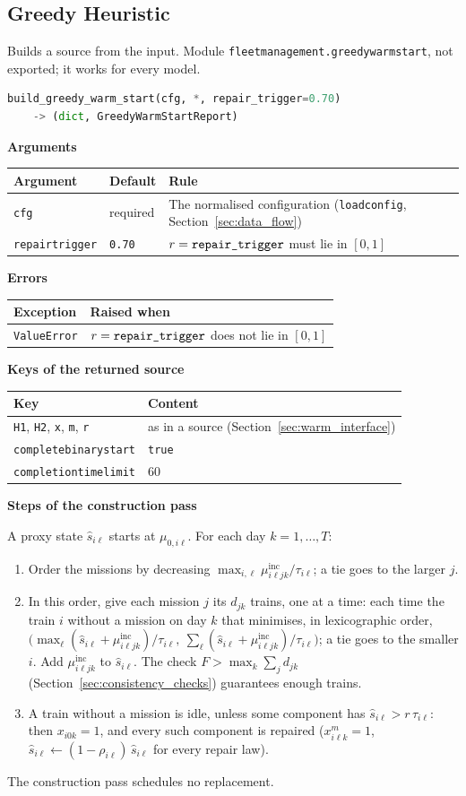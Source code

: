 \documentclass[11pt,a4paper]{article}
\makeatletter
\theoremstyle{plain}
\theoremstyle{definition}
\newcommand{\inc}{\mathrm{inc}}
\newcommand{\blockhead}[1]{\par\noindent\textbf{#1}\par\nobreak}
\renewcommand{\_}{\textunderscore\allowbreak{}}
\providecommand{\rejrow}[2]{{\raggedright #1\par} & {\raggedright #2\par} \\}
\providecommand{\typerow}[3]{{\raggedright #1\par} & {\raggedright #2\par} & {\raggedright #3\par} \\}
\providecommand{\tabstart}[2]{\begingroup\small\begin{longtable}{@{}#1@{}}\toprule #2 \\ \midrule \endhead}
\providecommand{\tabend}{\bottomrule\end{longtable}\endgroup}
\makeatother
\begin{document}
\subsection{Greedy Heuristic}
\label{sec:greedy}

Builds a source from the input. Module \texttt{fleet\_management.greedy\_warm\_start}, not exported; it works for every model.

\begin{lstlisting}[language=Python]
build_greedy_warm_start(cfg, *, repair_trigger=0.70)
    -> (dict, GreedyWarmStartReport)
\end{lstlisting}

\blockhead{Arguments}
\tabstart{p{4.3cm}p{2.3cm}p{8.2cm}}{Argument & Default & Rule}
\typerow{\texttt{cfg}}{required}{The normalised configuration (\texttt{load\_config}, Section~\ref{sec:data_flow})}
\typerow{\texttt{repair\_trigger}}{\texttt{0.70}}{$r = \texttt{repair\_trigger}$ must lie in $[0,1]$}
\tabend

\blockhead{Errors}
\tabstart{p{3.4cm}p{11.6cm}}{Exception & Raised when}
\rejrow{\texttt{ValueError}}{$r = \texttt{repair\_trigger}$ does not lie in $[0,1]$}
\tabend

\blockhead{Keys of the returned source}
\tabstart{p{5.2cm}p{9.8cm}}{Key & Content}
\rejrow{\texttt{H1}, \texttt{H2}, \texttt{x}, \texttt{m}, \texttt{r}}{as in a source (Section~\ref{sec:warm_interface})}
\rejrow{\texttt{complete\_binary\_start}}{\texttt{true}}
\rejrow{\texttt{completion\_time\_limit}}{$60$}
\tabend

\blockhead{Steps of the construction pass}
A proxy state $\hat s_{i\ell}$ starts at $\mu_{0,i\ell}$. For each day $k = 1,\ldots,T$:
\begin{enumerate}[nosep,label=\arabic*.]
  \item Order the missions by decreasing $\max_{i,\ell} \mu^{\inc}_{i\ell jk}/\tau_{i\ell}$; a tie goes to the larger $j$.
  \item In this order, give each mission $j$ its $d_{jk}$ trains, one at a time: each time the train $i$ without a mission on day $k$ that minimises, in lexicographic order,
    $\bigl(\max_\ell (\hat s_{i\ell} + \mu^{\inc}_{i\ell jk})/\tau_{i\ell},\ \sum_\ell (\hat s_{i\ell} + \mu^{\inc}_{i\ell jk})/\tau_{i\ell}\bigr)$; a tie goes to the smaller $i$.
    Add $\mu^{\inc}_{i\ell jk}$ to $\hat s_{i\ell}$. The check $F > \max_k \sum_j d_{jk}$ (Section~\ref{sec:consistency_checks}) guarantees enough trains.
  \item A train without a mission is idle, unless some component has $\hat s_{i\ell} > r\,\tau_{i\ell}$: then $x_{i0k} = 1$, and every such component is repaired ($x^m_{i\ell k} = 1$, $\hat s_{i\ell} \leftarrow (1-\rho_{i\ell})\,\hat s_{i\ell}$ for every repair law).
\end{enumerate}
The construction pass schedules no replacement.
\end{document}
